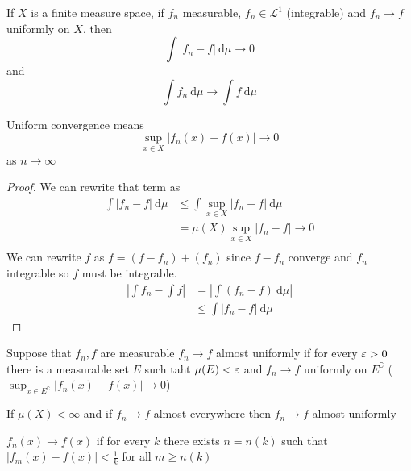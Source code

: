 
\begin{theorem}
  If $X$ is a finite measure space, if $f_n$ measurable, $f_n \in \mathcal{L}^1$ (integrable) and $f_n \to f$ uniformly on $X$. 
  then $$\int |f_n - f| \ \mathrm{d}\mu \to 0$$
  and 
  $$\int f_n\ \mathrm{d}\mu \to \int f\ \mathrm{d}\mu$$
\end{theorem}
  
\begin{remark}
  Uniform convergence means
  \[\sup_{x \in X} |f_n(x) - f(x)| \to 0\]
  as $n \to \infty$
\end{remark}

\begin{proof}
  We can rewrite that term as 
  \begin{align*}
    \int |f_n - f| \ \mathrm{d}\mu &\le \int \sup_{x\in X} |f_n - f|\ \mathrm{d}\mu \\ 
    &= \mu(X) \sup_{x\in X} |f_n - f| \to 0\\
  \end{align*}
  We can rewrite $f$ as $f = (f - f_n) + (f_n)$ since $f-f_n$ converge and $f_n$ integrable so $f$ must be integrable.
  \begin{align*}
    \left|\int f_n - \int f\right| &= \left|\int (f_n - f)\ \mathrm{d}\mu\right| \\
    &\le \int |f_n - f|\ \mathrm{d}\mu 
  \end{align*}
\end{proof}

\begin{definition}
  Suppose that $f_n, f$ are measurable
  $f_n \to f$ almost uniformly if for every $\varepsilon > 0$
  there is a measurable set $E$ such taht $\mu(E) < \varepsilon$ and $f_n \to f$ uniformly on $E^\complement$
  ($\sup_{x\in E^\complement} |f_n(x) - f(x)| \to 0$)
\end{definition}

\begin{theorem}
  If $\mu(X) < \infty$ and if $f_n \to f$ almost everywhere then 
  $f_n \to f$ almost uniformly
\end{theorem}

\begin{remark}
  $f_n(x) \to f(x)$ if for every $k$ there exists $n = n(k)$ such that
  $|f_m(x) - f(x)| < \frac1k$ for all $m \ge n(k)$
\end{remark}

